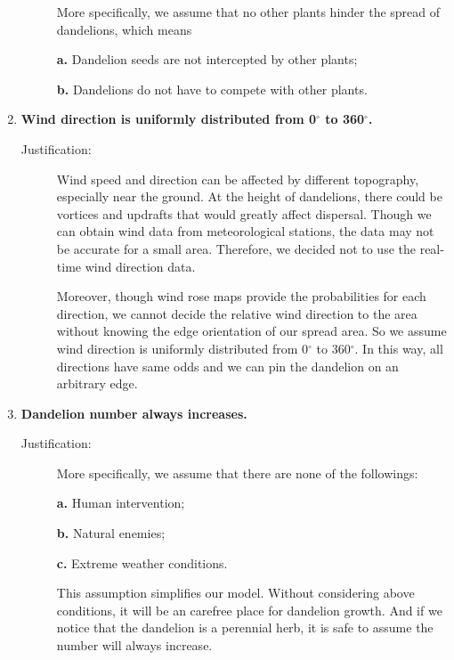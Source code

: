 \documentclass[12pt]{article}
\begin{document}
\begin{enumerate}
\begin{description}
				More specifically, we assume that no other plants hinder the spread of dandelions, which means
				
				\textbf{a.} Dandelion seeds are not intercepted by other plants;
				
				\textbf{b.} Dandelions do not have to compete with other plants.  
				
			\end{description}
			
			\item \textbf{Wind direction is uniformly distributed from 0$^\circ$ to 360$^\circ$.}
			\vspace{-0.125in}
			\begin{description}
				\item[Justification:] \label{assumption:wind} Wind speed and direction can be affected by different topography, especially near the ground. At the height of dandelions, there could be vortices and updrafts that would greatly affect dispersal.  Though we can obtain wind data from meteorological stations, the data may not be accurate for a  small area. Therefore, we decided not to use the real-time wind direction data.
				
				Moreover, though wind rose maps provide the probabilities for each direction, we cannot decide the relative wind direction to the area without knowing the edge orientation of our spread area.  So we assume wind direction is uniformly distributed from 0$^\circ$ to 360$^\circ$. In this way, all directions have same odds and we can pin the dandelion on an arbitrary edge.
			\end{description}
			
			\item \textbf{Dandelion number always increases.}
			\vspace{-0.125in}
			\begin{description}
				\item[Justification:] More specifically, we assume that there are none of the followings:
				 
				 \textbf{a.} Human intervention;
				 
				 \textbf{b.} Natural enemies;
				 
				 \textbf{c.} Extreme weather conditions.
				
				This assumption simplifies our model.  Without considering above conditions, it will be an carefree place for dandelion growth.  And if we notice that the dandelion is a perennial herb, it is safe to assume the number will always increase.
			\end{description}
			
		\end{enumerate}
		
\end{document}
